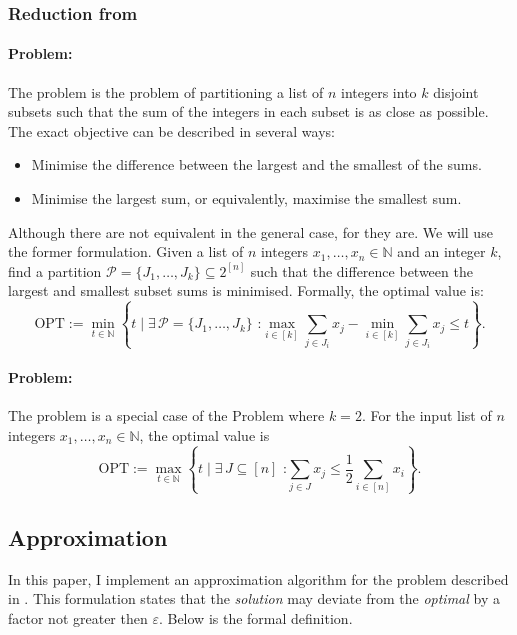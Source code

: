 \subsubsection{Reduction from \MultPart}
\paragraph{\MultPart Problem:}
The \MultPart problem is the problem of partitioning a list of \(n\) integers into \(k\) disjoint subsets such that the sum of the integers in each subset is as close as possible. The exact objective can be described in several ways:
\begin{itemize}
    \item Minimise the difference between the largest and the smallest of the sums.
    \item Minimise the largest sum, or equivalently, maximise the smallest sum.
\end{itemize}
Although there are not equivalent in the general case, for \Partition they are. We will use the former formulation.
Given a list of \(n\) integers \(x_1, \ldots, x_n \in \mathbb{N}\) and an integer \(k\), find a partition \(\mathcal{P} = \{J_1, \ldots, J_k\} \subseteq 2^{[n]}\) such that the difference between the largest and smallest subset sums is minimised. Formally, the optimal value is:
\[
\text{OPT} := \min_{t \in \mathbb{N}} \left\{ t \mid \exists \, \mathcal{P} = \{J_1, \ldots, J_k\} \text{ :} \max_{i \in [k]} \sum_{j \in J_i} x_j - \min_{i \in [k]} \sum_{j \in J_i} x_j \leq t \right\}.
\]
\paragraph{\Partition Problem:}
The \Partition problem is a special case of the \MultPart Problem where \(k = 2\). For the input list of \(n\) integers \(x_1, \ldots, x_n \in \mathbb{N}\), the optimal value is
\[
    \text{OPT} := \max_{t \in \mathbb{N}} \left\{ t \mid \exists \, J \subseteq [n] \text{ :} \sum_{j \in J} x_j \le \frac{1}{2} \sum_{i \in [n]} x_i \right\}.
\]

\subsection{Approximation}
In this paper, I implement an approximation algorithm for the \Partition problem described in \cite{deng}. This formulation states that the \textit{solution} may deviate from the \textit{optimal} by a factor not greater then \(\varepsilon\). Below is the formal definition.
